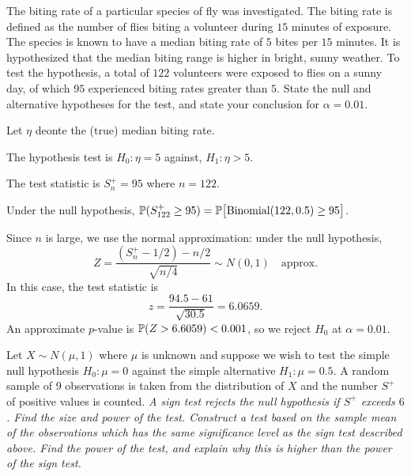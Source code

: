 \begin{exercise}
\begin{questions}

\question %
The biting rate of a particular species of fly was investigated. The biting rate is defined as the number of flies biting a volunteer during $15$ minutes of exposure. The species is known to have a median biting rate of $5$ bites per $15$ minutes. It is hypothesized that the median biting range is higher in bright, sunny weather. To test the hypothesis, a total of $122$ volunteers were exposed to flies on a sunny day, of which $95$ experienced biting rates greater than $5$.
State the null and alternative hypotheses for the test, and state your conclusion for $\alpha = 0.01$.
\begin{answer}
Let $\eta$ deonte the (true) median biting rate. 
\par
The hypothesis test is $H_0:\eta=5$ against, $H_1:\eta>5$.
\par
The test statistic is $S_n^{+} = 95$ where $n=122$. 

\bigskip
Under the null hypothesis, $\mathbb{P}(S_{122}^{+}\geq 95) = \mathbb{P}\big[\text{Binomial}(122,0.5) \geq 95\big]$.

\bigskip
Since $n$ is large, we use the normal approximation: under the null hypothesis,
\[
Z = \frac{(S_n^{+}-1/2) - n/2}{\sqrt{n/4}} \sim N (0,1) \quad\text{approx.}
\]
In this case, the test statistic is
\[
z = \frac{94.5 - 61}{\sqrt{30.5}} = 6.0659.
\]
An approximate $p$-value is $\mathbb{P}(Z>6.6059) < 0.001$, so we reject $H_0$ at $\alpha=0.01$.
\end{answer}

\question %
Let $X\sim N (\mu,1)$ where $\mu$ is unknown and suppose we wish to test the simple null hypothesis $H_0:\mu=0$ against the simple alternative $H_1:\mu=0.5$. A random sample of 9 observations is taken from the distribution of $X$ and the number $S^{+}$ of positive values is counted.
\ben
\it %
A sign test rejects the null hypothesis if $S^{+}$ exceeds $6$. Find the size and power of the test.
\it %
Construct a test based on the sample mean of the observations which has the same significance level as the sign test described above. Find the power of the test, and explain why this is higher than the power of the sign test.
\een


\end{questions}
\end{exercise}
